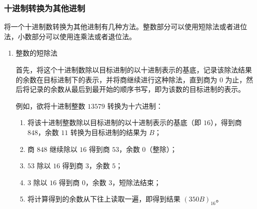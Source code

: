         \subsubsection{十进制转换为其他进制}\label{subsubsec:ArithBasics/positional-notation-presentation-and-conversion/conversion/from-decimal}
            将一个十进制数转换为其他进制有几种方法。整数部分可以使用短除法或者进位法，小数部分可以使用连乘法或者退位法。
            \begin{enumerate}
                \item 整数的短除法

                    首先，将这个十进制数除以目标进制的以十进制表示的基底，记录该除法结果的余数在目标进制下的表示，并将商继续进行这种除法，直到商为 0 为止，然后将记录的余数从最后到最开始的顺序书写，即为该数的目标进制的表示。

                    例如，欲将十进制整数 $13579$ 转换为十六进制：

                    \begin{enumerate}
                        \item 将该十进制整数除以目标进制的以十进制表示的基底（即 $16$），得到商 $848$，余数 $11$ 转换为目标进制的结果为 $B$；
                        \item 商 $848$ 继续除以 $16$ 得到商 $53$，余数 $0$（整除）；
                        \item $53$ 除以 $16$ 得到商 $3$，余数 $5$；
                        \item $3$ 除以 $16$ 得到商 $0$，余数 $3$，短除法结束；
                        \item 将计算得到的余数从下往上读取一遍，即得到结果 $(350B)_{16}$。
                    \end{enumerate}


\end{enumerate}
